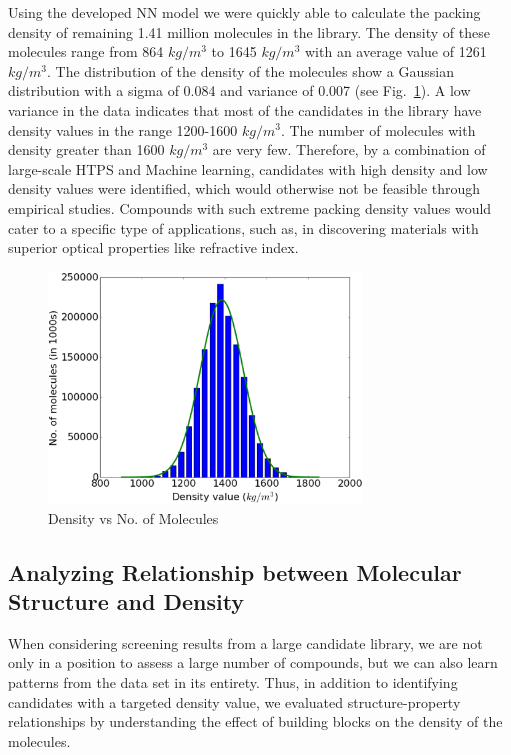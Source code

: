Using the developed NN model we were quickly able to calculate the packing density of remaining 1.41 million molecules in the library. The density of these molecules range from 864 $kg/m^3$ to 1645 $kg/m^3$ with an average value of 1261 $kg/m^3$. The distribution of the density of the molecules show a Gaussian distribution with a sigma of 0.084 and variance of 0.007 (see Fig.\ \ref{fig:den_hist}). A low variance in the data indicates that most of the candidates in the library have density values in the range 1200-1600 $kg/m^3$. The number of molecules with density greater than 1600 $kg/m^3$ are very few. Therefore, by a combination of large-scale HTPS and Machine learning, candidates with high density and low density values were identified, which would otherwise not be feasible through empirical studies. Compounds with such extreme packing density values would cater to a specific type of applications, such as, in discovering materials with superior optical properties like refractive index. %

\begin{figure}[htbp] 
	\centering
	\includegraphics[width=0.744\textwidth]{Chapter-6/Figures/hist.eps}
	\caption{Density vs No. of Molecules} 
	\label{fig:den_hist} 
\end{figure} 

\subsection{Analyzing Relationship between Molecular Structure and Density}
\label{subsec:spr}

When considering screening results from a large candidate library, we are not only in a position to assess a large number of compounds, but we can also learn patterns from the data set in its entirety. Thus, in addition to identifying candidates with a targeted density value, we evaluated structure-property relationships by understanding the effect of building blocks on the density of the molecules.

